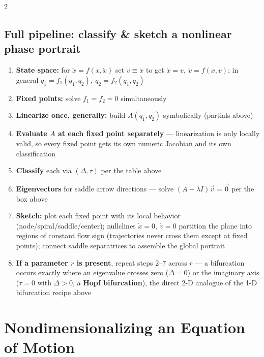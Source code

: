\documentclass[10pt]{article}
\begin{document}
\begin{multicols}{2}
\subsection*{Full pipeline: classify \& sketch a nonlinear phase portrait}
\begin{enumerate}[nosep, leftmargin=1.3em]
    \item \textbf{State space:} for $\ddot x=f(x,\dot x)$ set $v\equiv\dot x$ to get $\dot x=v,\ \dot v=f(x,v)$; in general $\dot q_1=f_1(q_1,q_2),\ \dot q_2=f_2(q_1,q_2)$
    \item \textbf{Fixed points:} solve $f_1=f_2=0$ simultaneously
    \item \textbf{Linearize once, generally:} build $A(q_1,q_2)$ symbolically (partials above)
    \item \textbf{Evaluate $A$ at each fixed point separately} --- linearization is only locally valid, so every fixed point gets its own numeric Jacobian and its own classification
    \item \textbf{Classify} each via $(\Delta,\tau)$ per the table above
    \item \textbf{Eigenvectors} for saddle arrow directions --- solve $(A-\lambda I)\vec v=\vec 0$ per the box above
    \item \textbf{Sketch:} plot each fixed point with its local behavior (node/spiral/saddle/center); nullclines $\dot x=0,\ \dot v=0$ partition the plane into regions of constant flow sign (trajectories never cross them except at fixed points); connect saddle separatrices to assemble the global portrait
    \item \textbf{If a parameter $r$ is present}, repeat steps 2--7 across $r$ --- a bifurcation occurs exactly where an eigenvalue crosses zero ($\Delta=0$) or the imaginary axis ($\tau=0$ with $\Delta>0$, a \textbf{Hopf bifurcation}), the direct 2-D analogue of the 1-D bifurcation recipe above
\end{enumerate}

\section*{Nondimensionalizing an Equation of Motion}

\end{multicols}
\end{document}
